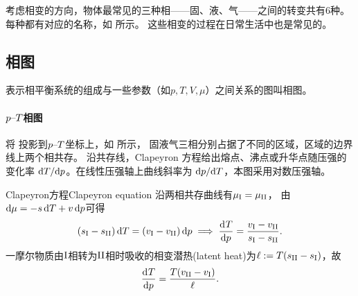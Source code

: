 考虑相变的方向，物体最常见的三种相——固、液、气——之间的转变共有6种。每种都有对应的名称，如 所示。
这些相变的过程在日常生活中也是常见的。

\begin{notecaptionblock}
	\label{fig:phase transition}
\end{notecaptionblock}

\subsection{相图}
\label{ssec:phase graph}

表示相平衡系统的组成与一些参数（如$p,T,V,\mu$）之间关系的图叫相图。

\begin{notecaptionblock}
	\label{fig:H2O phase P-T-V}
\end{notecaptionblock}

\paragraph{$p\vs T$相图}

将 投影到$p\vs T$坐标上，如 所示，
固液气三相分别占据了不同的区域，区域的边界线上两个相共存。
沿共存线，Clapeyron 方程给出熔点、沸点或升华点随压强的变化率 $\d T/\nd p$。在线性压强轴上曲线斜率为 $\d p/\nd T$，本图采用对数压强轴。

\begin{theorem}
	{Clapeyron方程}{Clapeyron equation}
	沿两相共存曲线有$\mu_\phaseI = \mu_\phaseII$，
	由$\d\mu = -s\d T + v\d p$可得
	\[
		(s_\phaseI - s_\phaseII)\d T = (v_\phaseI - v_\phaseII)\d p \implies \dv Tp = \frac{v_\phaseI - v_\phaseII}{s_\phaseI - s_\phaseII}.
	\]
	一摩尔物质由$\phaseI$相转为$\phaseII$相时吸收的相变潜热(latent heat)为$\ell := T(s_\phaseII - s_\phaseI)$，故
	\begin{equation}
		\dv Tp = \frac{T(v_\phaseII - v_\phaseI)}\ell.
	\end{equation}
\end{theorem}

